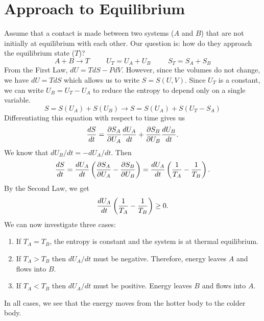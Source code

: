     \section{Approach to Equilibrium}
        Assume that a contact is made between two systems ($A$ and $B$) that are not initially at equilibrium with each other. Our question is: how do they approach the equilibrium state ($T$)?
        \begin{equation*}
            A+B\longrightarrow T \hspace{1cm} U_T = U_A + U_B \hspace{1cm} S_T = S_A+S_B
        \end{equation*}
        From the First Law, $dU = TdS - PdV$. However, since the volumes do not change, we have $dU = TdS$ which allows us to write $S=S(U,V)$. 
        Since $U_T$ is a constant, we can write $U_B = U_T-U_A$ to reduce the entropy to depend only on a single variable. 
        \begin{equation}
            S = S(U_A) + S(U_B) \longrightarrow S = S(U_A) + S(U_T-S_A)
        \end{equation}
        Differentiating this equation with respect to time gives us
        \begin{equation}
            \frac{d S}{d t} = \frac{\partial S_A}{\partial U_A}\frac{d U_A}{d t} + \frac{\partial S_B}{\partial U_B}\frac{d U_B}{d t}.
        \end{equation}
        We know that $dU_B/dt = - dU_A/dt$. Then
        \begin{equation}
            \frac{d S}{d t} = \frac{d U_A}{d t}\left( \frac{\partial S_A}{\partial U_A}-\frac{\partial S_B}{\partial U_B} \right) = \frac{d U_A}{d t}\left( \frac{1}{T_A}-\frac{1}{T_B} \right).
        \end{equation}
        By the Second Law, we get
        \begin{equation}
            \frac{d U_A}{d t}\left( \frac{1}{T_A}-\frac{1}{T_B} \right) \geq 0.
        \end{equation}
        We can now investigate three cases:
        \begin{enumerate}
            \item If $T_A=T_B$, the entropy is constant and the system is at thermal equilibrium.
            \item If $T_A>T_B$ then $dU_A/dt$ must be negative. Therefore, energy leaves $A$ and flows into $B$.
            \item If $T_A<T_B$ then $dU_A/dt$ must be positive. Energy leaves $B$ and flows into $A$.
        \end{enumerate}
        In all cases, we see that the energy moves from the hotter body to the colder body. \\
